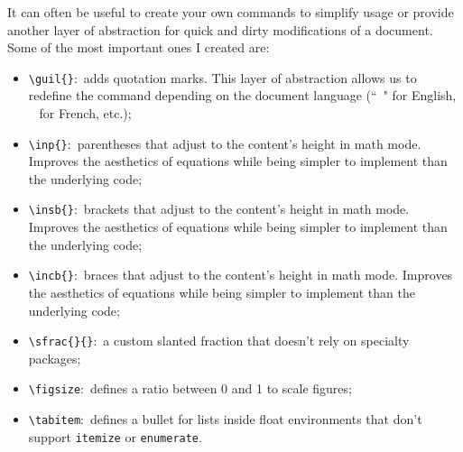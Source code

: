 It can often be useful to create your own \glspl{command} to simplify usage or provide another layer of abstraction for quick and dirty modifications of a document. Some of the most important ones I created are:

\begin{itemize}
    \item \texttt{\textbackslash{}guil\{\}}:~adds quotation marks. This layer of abstraction allows us to redefine the \gls{command} depending on the document language (``~" for English, \guillemotleft~\guillemotright{} for French, etc.);
    \item \texttt{\textbackslash{}inp\{\}}:~parentheses that adjust to the content's height in math mode. Improves the aesthetics of equations while being simpler to implement than the underlying code;
    \item \texttt{\textbackslash{}insb\{\}}:~brackets that adjust to the content's height in math mode. Improves the aesthetics of equations while being simpler to implement than the underlying code;
    \item \texttt{\textbackslash{}incb\{\}}:~braces that adjust to the content's height in math mode. Improves the aesthetics of equations while being simpler to implement than the underlying code;
    \item \texttt{\textbackslash{}sfrac\{\}\{\}}:~a custom slanted fraction that doesn't rely on specialty \glspl{package};
    \item \texttt{\textbackslash{}figsize}:~defines a ratio between 0 and 1 to scale figures;
    \item \texttt{\textbackslash{}tabitem}:~defines a bullet for lists inside float \glspl{environment} that don't support \texttt{itemize} or \texttt{enumerate}.
\end{itemize}